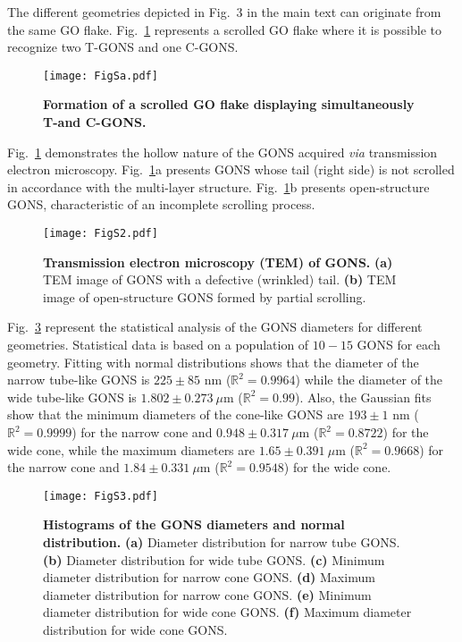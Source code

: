\newpage

The different geometries depicted in Fig.~3 in the main text can originate from the same GO flake. Fig.~\ref{figSa_AppB} represents a scrolled GO flake where it is possible to recognize two T-GONS and one C-GONS.

\begin{figure}[h!]
  \centering
  \texttt{[image: FigSa.pdf]}
  \caption{\textbf{Formation of a scrolled GO flake displaying simultaneously T-and C-GONS.}}
  \label{figSa_AppB}
\end{figure}

Fig.~\ref{figSa_AppB} demonstrates the hollow nature of the GONS acquired \textit{via} transmission electron microscopy. Fig.~\ref{figSa_AppB}a presents GONS whose tail (right side) is not scrolled in accordance with the multi-layer structure. Fig.~\ref{figSa_AppB}b presents open-structure GONS, characteristic of an incomplete scrolling process.

\begin{figure}[h!]
  \centering
  \texttt{[image: FigS2.pdf]}
  \caption{\textbf{Transmission electron microscopy (TEM) of GONS.} \textbf{(a)} TEM image of GONS with a defective (wrinkled) tail. \textbf{(b)} TEM image of open-structure GONS formed by partial scrolling.}
  \label{figS2_AppB}
\end{figure}

\newpage

Fig.~\ref{figS4_AppB} represent the statistical analysis of the GONS diameters for different geometries. Statistical data is based on a population of $10-15$ GONS for each geometry. Fitting with normal distributions shows that the diameter of the narrow tube-like GONS is $225 \pm 85$ nm ($\mathbb{R}^{2} = 0.9964$) while the diameter of the wide tube-like GONS is $1.802 \pm 0.273\ \mu$m ($\mathbb{R}^{2} = 0.99$). Also, the Gaussian fits show that the minimum diameters of the cone-like GONS are $193 \pm 1$ nm ($\mathbb{R}^{2} = 0.9999$) for the narrow cone and $0.948 \pm 0.317\ \mu$m ($\mathbb{R}^{2} = 0.8722$) for the wide cone, while the maximum diameters are $1.65 \pm 0.391\ \mu$m ($\mathbb{R}^{2} = 0.9668$) for the narrow cone and $1.84 \pm 0.331\ \mu$m ($\mathbb{R}^{2} = 0.9548$) for the wide cone.

\begin{figure}[t!]
  \centering
  \texttt{[image: FigS3.pdf]}
  \caption{\textbf{Histograms of the GONS diameters and normal distribution.} \textbf{(a)} Diameter distribution for narrow tube GONS. \textbf{(b)} Diameter distribution for wide tube GONS. \textbf{(c)} Minimum diameter distribution for narrow cone GONS. \textbf{(d)} Maximum diameter distribution for narrow cone GONS. \textbf{(e)} Minimum diameter distribution for wide cone GONS. \textbf{(f)} Maximum diameter distribution for wide cone GONS.}
  \label{figS4_AppB}
\end{figure}


